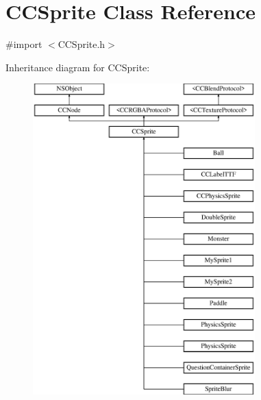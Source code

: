 \hypertarget{class_c_c_sprite}{\section{C\-C\-Sprite Class Reference}
\label{class_c_c_sprite}
}


{\ttfamily \#import $<$C\-C\-Sprite.\-h$>$}

Inheritance diagram for C\-C\-Sprite\-:\begin{figure}[H]
\begin{center}
\leavevmode
\includegraphics[height=12.000000cm]{class_c_c_sprite}
\end{center}
\end{figure}
